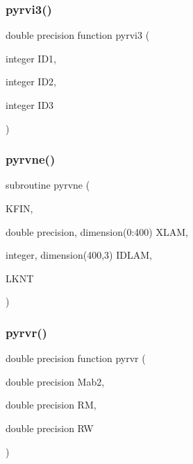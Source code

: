 \mbox{\label{pythia-6_84_824_8f_a797da463f08ad3ff91ca5d428c5f5cc7}} 
\subsubsection{\texorpdfstring{pyrvi3()}{pyrvi3()}}
{\footnotesize\ttfamily double precision function pyrvi3 (\begin{DoxyParamCaption}\item[{integer}]{I\+D1,  }\item[{integer}]{I\+D2,  }\item[{integer}]{I\+D3 }\end{DoxyParamCaption})}

\mbox{\label{pythia-6_84_824_8f_af64d7b9f2943cb831c935b51901191a5}} 
\subsubsection{\texorpdfstring{pyrvne()}{pyrvne()}}
{\footnotesize\ttfamily subroutine pyrvne (\begin{DoxyParamCaption}\item[{}]{K\+F\+IN,  }\item[{double precision, dimension(0\+:400)}]{X\+L\+AM,  }\item[{integer, dimension(400,3)}]{I\+D\+L\+AM,  }\item[{}]{L\+K\+NT }\end{DoxyParamCaption})}

\mbox{\label{pythia-6_84_824_8f_a5168f5ce45865125ee90d4a1967db80d}} 
\subsubsection{\texorpdfstring{pyrvr()}{pyrvr()}}
{\footnotesize\ttfamily double precision function pyrvr (\begin{DoxyParamCaption}\item[{double precision}]{Mab2,  }\item[{double precision}]{RM,  }\item[{double precision}]{RW }\end{DoxyParamCaption})}

